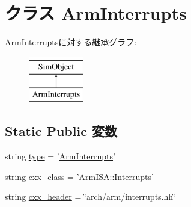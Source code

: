 \hypertarget{classArmInterrupts_1_1ArmInterrupts}{
\section{クラス ArmInterrupts}
\label{classArmInterrupts_1_1ArmInterrupts}
}
ArmInterruptsに対する継承グラフ:\begin{figure}[H]
\begin{center}
\leavevmode
\includegraphics[height=2cm]{classArmInterrupts_1_1ArmInterrupts}
\end{center}
\end{figure}
\subsection*{Static Public 変数}
\begin{DoxyCompactItemize}
\item 
string \hyperlink{classArmInterrupts_1_1ArmInterrupts_acce15679d830831b0bbe8ebc2a60b2ca}{type} = '\hyperlink{classArmInterrupts_1_1ArmInterrupts}{ArmInterrupts}'
\item 
string \hyperlink{classArmInterrupts_1_1ArmInterrupts_a58cd55cd4023648e138237cfc0822ae3}{cxx\_\-class} = '\hyperlink{classArmISA_1_1Interrupts}{ArmISA::Interrupts}'
\item 
string \hyperlink{classArmInterrupts_1_1ArmInterrupts_a17da7064bc5c518791f0c891eff05fda}{cxx\_\-header} = \char`\"{}arch/arm/interrupts.hh\char`\"{}
\end{DoxyCompactItemize}


